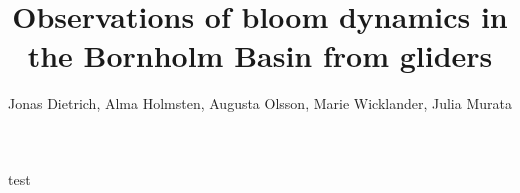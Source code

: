 \documentclass{article}
\title{Observations of bloom dynamics in the Bornholm Basin from gliders}
\author{Jonas Dietrich, Alma Holmsten, Augusta Olsson, Marie Wicklander, Julia Murata}
\begin{document}
\begin{titlepage}
  \maketitle
  \thispagestyle{empty}
\end{titlepage}


test\cite{Cauchy20182305}







\end{document}

